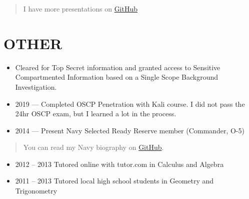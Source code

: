 \documentclass[10pt]{article}
\def\tightlist{}
\begin{document}
\begin{quote}
I have more presentations on \href{https://github.com/?q=slides}{GitHub}
\end{quote}

\section{OTHER}\label{other}

\begin{itemize}
\tightlist
\item
  Cleared for Top Secret information and granted access to Sensitive
  Compartmented Information based on a Single Scope Background
  Investigation.
\item
  2019 --- Completed OSCP Penetration with Kali course. I did not pass
  the 24hr OSCP exam, but I learned a lot in the process.
\item
  2014 --- Present Navy Selected Ready Reserve member (Commander, O-5)
\end{itemize}

\begin{quote}
You can read my Navy biography on
\href{https://github.com/jhwohlgemuth/navy-biography}{GitHub}.
\end{quote}

\begin{itemize}
\tightlist
\item
  2012 -- 2013 Tutored online with tutor.com in Calculus and Algebra
\item
  2011 -- 2013 Tutored local high school students in Geometry and
  Trigonometry
\end{itemize}

\end{document}
